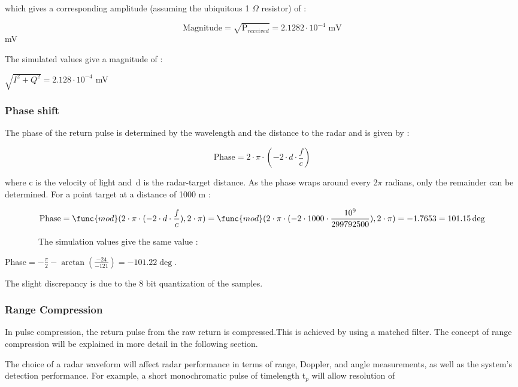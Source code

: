\documentclass[thmsa,a4paper,ukenglish]{report}
\begin{document}
which gives a corresponding amplitude (assuming the ubiquitous 1 $\Omega $
resistor) of :

\[
\text{Magnitude}=\sqrt{\text{P}_{received}}=2.1282\cdot 10^{-4}\text{ mV} 
\]
mV

The simulated values give a magnitude of :

$\sqrt{I^{2}+Q^{2}}=2.128\cdot 10^{-4}$ mV

\smallskip

\subsubsection{\protect\smallskip \protect\smallskip \protect\smallskip %
Phase shift}

The phase of the return pulse is determined by the wavelength and the
distance to the radar and is given by :

\[
\text{Phase}=2\cdot \pi \cdot (-2\cdot d\cdot \frac{f}{c}) 
\]

where c is the velocity of light and\ d is the radar-target distance. As the
phase wraps around every 2$\pi $ radians, only the remainder can be
determined. For a point target at a distance of 1000 m :

\begin{equation}
\text{Phase}=\func{mod}(2\cdot \pi \cdot (-2\cdot d\cdot \frac{f}{c}),2\cdot
\pi )=\func{mod}(2\cdot \pi \cdot (-2\cdot 1000\cdot \frac{10^{9}}{299792500}%
),2\cdot \pi )=-1.7653=101.15\deg
\end{equation}

\ \ \ \ \ \ \ \ The simulation values give the same value :

Phase$=-\frac{\pi }{2}-\arctan (\frac{-24}{-121})=-101.22\deg .$

The slight discrepancy is due to the 8 bit quantization of the
samples.\smallskip

\subsubsection{Range Compression}

\smallskip In pulse compression, the return pulse from the raw return is
compressed.\smallskip This is achieved by using a matched filter. The
concept of range compression will be explained in more detail in the
following section.

\smallskip

\smallskip The choice of a radar waveform will affect radar performance in
terms of range, Doppler, and angle measurements, as well as the system's
detection performance. For example, a short monochromatic pulse of
timelength t$_{p}$ will allow resolution of
\end{document}
